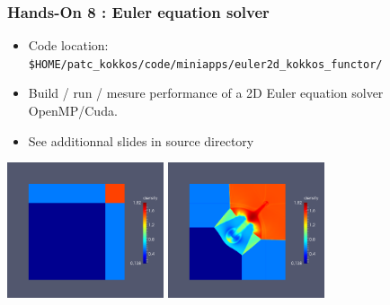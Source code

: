 \begin{frame}[fragile=singleslide]
  \frametitle{Hands-On 8 : Euler equation solver}

  \begin{itemize}
  \item Code location: \texttt{\$HOME/patc\_kokkos/code/miniapps/euler2d\_kokkos\_functor/}
  \item Build / run / mesure performance of a 2D Euler equation solver OpenMP/Cuda.
  \item See additionnal slides in source directory
  \end{itemize}
  
  \begin{center}
    \includegraphics[height=4cm]{../euler/images/riemann/riemann_1}
    \hspace{0.1cm}
    \includegraphics[height=4cm]{../euler/images/riemann/riemann_2}
  \end{center}


\end{frame}
